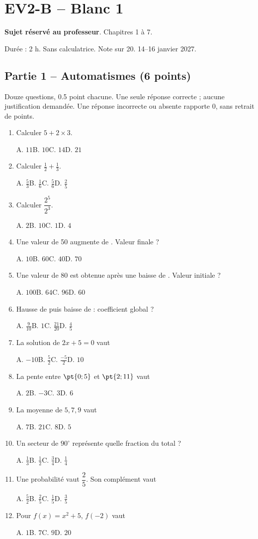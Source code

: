\mxnewpage\section*{EV2-B -- Blanc 1}\label{EV2-B}
\textbf{Sujet réservé au professeur}. Chapitres 1 à 7.\par Durée : 2 h. Sans calculatrice. Note sur 20. 14–16 janvier 2027.
\subsection*{Partie 1 -- Automatismes (6 points)}
Douze questions, \num{0,5} point chacune. Une seule réponse correcte ; aucune justification demandée. Une réponse incorrecte ou absente rapporte 0, sans retrait de points.
\begin{enumerate}
\item Calculer $5+2\times3$.\par A. $11$\quad B. $10$\quad C. $14$\quad D. $21$
\item Calculer $\frac12+\frac13$.\par A. $\frac{5}{3}$\quad B. $\frac{1}{6}$\quad C. $\frac{5}{6}$\quad D. $\frac{2}{5}$
\item Calculer $\dfrac{2^5}{2^{3}}$.\par A. $2$\quad B. $10$\quad C. $1$\quad D. $4$
\item Une valeur de 50 augmente de . Valeur finale ?\par A. $10$\quad B. $60$\quad C. $40$\quad D. $70$
\item Une valeur de 80 est obtenue après une baisse de . Valeur initiale ?\par A. $100$\quad B. $64$\quad C. $96$\quad D. $60$
\item Hausse de  puis baisse de  : coefficient global ?\par A. $\frac{9}{10}$\quad B. $1$\quad C. $\frac{21}{20}$\quad D. $\frac{4}{5}$
\item La solution de $2x+5=0$ vaut\par A. $-10$\quad B. $\frac{5}{2}$\quad C. $\frac{-5}{2}$\quad D. $10$
\item La pente entre $\pt{0;5}$ et $\pt{2;11}$ vaut\par A. $2$\quad B. $-3$\quad C. $3$\quad D. $6$
\item La moyenne de $5, 7, 9$ vaut\par A. $7$\quad B. $21$\quad C. $8$\quad D. $5$
\item Un secteur de $90^\circ$ représente quelle fraction du total ?\par A. $\frac{1}{3}$\quad B. $\frac{1}{2}$\quad C. $\frac{3}{4}$\quad D. $\frac{1}{4}$
\item Une probabilité vaut $\dfrac{2}{5}$. Son complément vaut\par A. $\frac{5}{2}$\quad B. $\frac{2}{5}$\quad C. $\frac{1}{5}$\quad D. $\frac{3}{5}$
\item Pour $f(x)=x^2+5$, $f(-2)$ vaut\par A. $1$\quad B. $7$\quad C. $9$\quad D. $20$
\end{enumerate}
